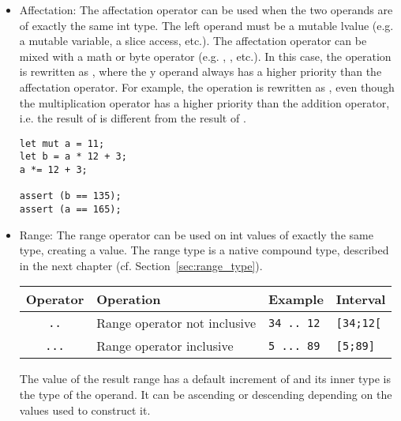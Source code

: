 \begin{itemize}
\item Affectation: The affectation operator \token{=} can be used when the two
  operands are of exactly the same int type. The left operand must be a mutable
  lvalue (e.g. a mutable variable, a slice access, etc.). The affectation
  operator can be mixed with a math or byte operator (e.g. \token{+=},
  \token{\&=}, etc.). In this case, the operation  is rewritten
  as , where the y operand always has a higher priority than
  the affectation operator. For example, the operation  is
  rewritten as , even though the multiplication
  operator has a higher priority than the addition operator, i.e. the result of
   is different from the result of .

  \begin{lstlisting}[style=coloredverbatim]
let mut a = 11;
let b = a * 12 + 3;
a *= 12 + 3;

assert (b == 135);
assert (a == 165);
  \end{lstlisting}

\item Range: The range operator can be used on int values of exactly the same
  type, creating a  value. The range type is a native compound
  type, described in the next chapter (cf. Section~\ref{sec:range_type}).

  \begin{center}
    \begin{adjustbox}{max width=1.0\linewidth}
      \begin{tabular}{|c|lll|}
        \hline
        Operator & Operation & Example & Interval\\[0pt]
        \hline
        \texttt{..} & Range operator not inclusive & \texttt{34 .. 12} & \texttt{[34;12[}\\[0pt]
            \texttt{...} & Range operator inclusive & \texttt{5 ... 89} & \texttt{[5;89]}\\[0pt]
            \hline
      \end{tabular}
    \end{adjustbox}
  \end{center}

The value of the result range has a default increment of  and its
inner type is the type of the operand. It can be ascending or descending
depending on the values used to construct it.

\end{itemize}

